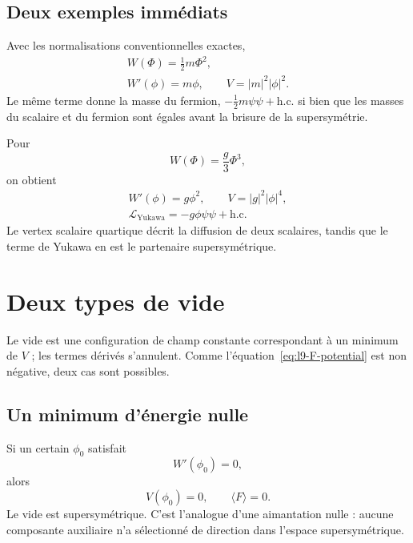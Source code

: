 \subsection{Deux exemples immédiats}

Avec les normalisations conventionnelles exactes,
\begin{equation}
\begin{gathered}
W(\Phi)=\frac12m\Phi^2,\\
W'(\phi)=m\phi,
\qquad V=|m|^2|\phi|^2.
\end{gathered}
\label{eq:l9-quadratic-W}
\end{equation}
Le même terme donne la masse du fermion,
\(-\tfrac12m\psi\psi+\mathrm{h.c.}\)
si bien que les masses du scalaire et du fermion sont égales avant la brisure de la supersymétrie.

Pour
\begin{equation}
W(\Phi)=\frac{g}{3}\Phi^3,
\end{equation}
on obtient
\begin{equation}
\begin{gathered}
W'(\phi)=g\phi^2,
\qquad V=|g|^2|\phi|^4,\\
\mathcal L_{\mathrm{Yukawa}}
=-g\phi\psi\psi+\mathrm{h.c.}
\end{gathered}
\label{eq:l9-cubic-W}
\end{equation}
Le vertex scalaire quartique décrit la diffusion de deux scalaires, tandis que le terme de Yukawa en est le partenaire supersymétrique.

\section{Deux types de vide}

Le vide est une configuration de champ constante correspondant à un minimum de \(V\) ; les termes dérivés s’annulent. Comme l’équation~\eqref{eq:l9-F-potential} est non négative, deux cas sont possibles.

\subsection{Un minimum d’énergie nulle}

Si un certain \(\phi_0\) satisfait
\begin{equation}
W'(\phi_0)=0,
\end{equation}
alors
\begin{equation}
V(\phi_0)=0,
\qquad
\langle F\rangle=0.
\label{eq:l9-unbroken-F}
\end{equation}
Le vide est supersymétrique. C’est l’analogue d’une aimantation nulle : aucune composante auxiliaire n’a sélectionné de direction dans l’espace supersymétrique.

